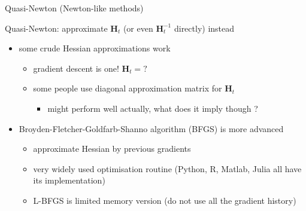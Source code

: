 \documentclass[ignorenonframetext,aspectratio=169]{beamer}
\providecommand{\tightlist}{%
  \setlength{\itemsep}{0pt}\setlength{\parskip}{0pt}}
\newcommand{\vv}[1]{\boldsymbol{#1}}
\begin{document}
\begin{frame}{Quasi-Newton (Newton-like methods)}
\protect\hypertarget{quasi-newton-newton-like-methods}{}

Quasi-Newton: approximate \(\vv{H}_t\) (or even \(\vv{H}_t^{-1}\)
directly) instead

\begin{itemize}
\tightlist
\item
  some crude Hessian approximations work

  \begin{itemize}
  \tightlist
  \item
    gradient descent is one! \(\vv{H}_t=?\)
  \item
    some people use diagonal approximation matrix for \(\vv{H}_t\)

    \begin{itemize}
    \tightlist
    \item
      might perform well actually, what does it imply though ?
    \end{itemize}
  \end{itemize}
\item
  Broyden-Fletcher-Goldfarb-Shanno algorithm (BFGS) is more advanced

  \begin{itemize}
  \tightlist
  \item
    approximate Hessian by previous gradients
  \item
    very widely used optimisation routine (Python, R, Matlab, Julia all
    have its implementation)
  \item
    L-BFGS is limited memory version (do not use all the gradient
    history)
  \end{itemize}
\end{itemize}

\end{frame}
\end{document}
